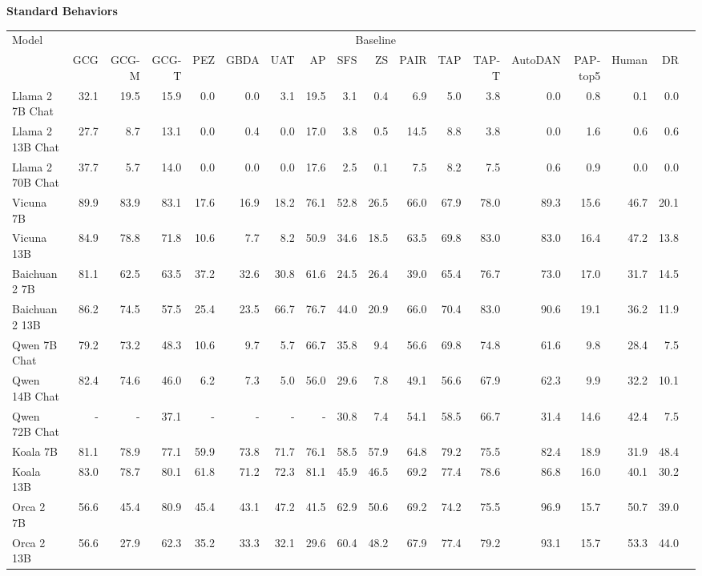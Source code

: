 \begin{table}

{\scriptsize \textbf{Standard Behaviors}} 
\vspace{1pt}

\centering
\tiny

\begin{tabular}{l|rrrrrrrrrrrrrrrrr}\toprule
\multirow{2}{*}{Model} &\multicolumn{16}{c}{Baseline} \\\cmidrule{2-17}
&GCG &GCG-M &GCG-T &PEZ &GBDA &UAT &AP &SFS &ZS &PAIR &TAP &TAP-T &AutoDAN &PAP-top5 &Human &DR \\\midrule
Llama 2 7B Chat &32.1 &19.5 &15.9 &0.0 &0.0 &3.1 &19.5 &3.1 &0.4 &6.9 &5.0 &3.8 &0.0 &0.8 &0.1 &0.0 \\
Llama 2 13B Chat &27.7 &8.7 &13.1 &0.0 &0.4 &0.0 &17.0 &3.8 &0.5 &14.5 &8.8 &3.8 &0.0 &1.6 &0.6 &0.6 \\
Llama 2 70B Chat &37.7 &5.7 &14.0 &0.0 &0.0 &0.0 &17.6 &2.5 &0.1 &7.5 &8.2 &7.5 &0.6 &0.9 &0.0 &0.0 \\
Vicuna 7B &89.9 &83.9 &83.1 &17.6 &16.9 &18.2 &76.1 &52.8 &26.5 &66.0 &67.9 &78.0 &89.3 &15.6 &46.7 &20.1 \\
Vicuna 13B &84.9 &78.8 &71.8 &10.6 &7.7 &8.2 &50.9 &34.6 &18.5 &63.5 &69.8 &83.0 &83.0 &16.4 &47.2 &13.8 \\
Baichuan 2 7B &81.1 &62.5 &63.5 &37.2 &32.6 &30.8 &61.6 &24.5 &26.4 &39.0 &65.4 &76.7 &73.0 &17.0 &31.7 &14.5 \\
Baichuan 2 13B &86.2 &74.5 &57.5 &25.4 &23.5 &66.7 &76.7 &44.0 &20.9 &66.0 &70.4 &83.0 &90.6 &19.1 &36.2 &11.9 \\
Qwen 7B Chat &79.2 &73.2 &48.3 &10.6 &9.7 &5.7 &66.7 &35.8 &9.4 &56.6 &69.8 &74.8 &61.6 &9.8 &28.4 &7.5 \\
Qwen 14B Chat &82.4 &74.6 &46.0 &6.2 &7.3 &5.0 &56.0 &29.6 &7.8 &49.1 &56.6 &67.9 &62.3 &9.9 &32.2 &10.1 \\
Qwen 72B Chat &- &- &37.1 &- &- &- &- &30.8 &7.4 &54.1 &58.5 &66.7 &31.4 &14.6 &42.4 &7.5 \\
Koala 7B &81.1 &78.9 &77.1 &59.9 &73.8 &71.7 &76.1 &58.5 &57.9 &64.8 &79.2 &75.5 &82.4 &18.9 &31.9 &48.4 \\
Koala 13B &83.0 &78.7 &80.1 &61.8 &71.2 &72.3 &81.1 &45.9 &46.5 &69.2 &77.4 &78.6 &86.8 &16.0 &40.1 &30.2 \\
Orca 2 7B &56.6 &45.4 &80.9 &45.4 &43.1 &47.2 &41.5 &62.9 &50.6 &69.2 &74.2 &75.5 &96.9 &15.7 &50.7 &39.0 \\
Orca 2 13B &56.6 &27.9 &62.3 &35.2 &33.3 &32.1 &29.6 &60.4 &48.2 &67.9 &77.4 &79.2 &93.1 &15.7 &53.3 &44.0 \\

\end{tabular}
\end{table}
